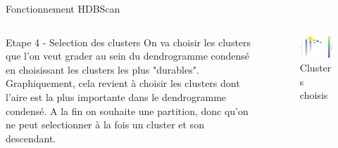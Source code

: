 \begin{frame}{Fonctionnement HDBScan }
    \begin{columns}
        \begin{column}{0.55\textwidth}
            \begin{block}{Etape 4 - Selection des clusters}
                    On va choisir les clusters que l'on veut grader au sein du dendrogramme condensé en choisissant les clusters les plus "durables".
                    Graphiquement, cela revient à choisir les clusters dont l'aire est la plus importante dans le dendrogramme condensé.
                    A la fin on souhaite une partition, donc qu'on ne peut selectionner à la fois un cluster et son descendant.
            \end{block}
        \end{column}
        \begin{column}{0.45\textwidth}
            \begin{figure}
                \includegraphics[height=0.4\paperheight]{images/Illustration-HDBScan-5.png}
                \caption{\label{fig:ill_HDBScan_5} Clusters choisis}
            \end{figure}
        \end{column}
    \end{columns}
\end{frame}

